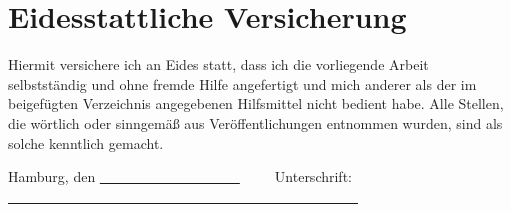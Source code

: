 \chapter*{Eidesstattliche Versicherung}
\thispagestyle{empty}

Hiermit versichere ich an Eides statt, dass ich die vorliegende Arbeit selbstständig und ohne fremde Hilfe angefertigt und mich anderer als der im beigefügten Verzeichnis angegebenen Hilfsmittel nicht bedient habe.
Alle Stellen, die wörtlich oder sinngemäß aus Veröffentlichungen entnommen wurden, sind als solche kenntlich gemacht. 


\vspace{2cm} 

\noindent Hamburg, den \uline{~~~~~~~~~~~~~~~~~~~~}~~~~~Unterschrift: \uline{~~~~~~~~~~~~~~~~~~~~~~~~~~~~~~~~~~~~~~~~~~~~~~~~~~} 
